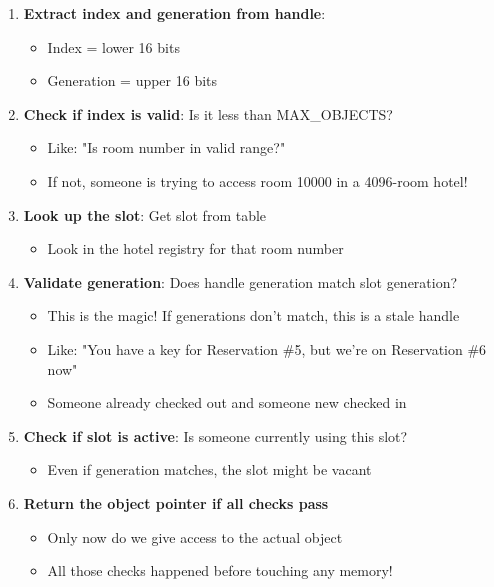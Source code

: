 \begin{enumerate}
    \item \textbf{Extract index and generation from handle}:
    \begin{itemize}
        \item Index = lower 16 bits
        \item Generation = upper 16 bits
    \end{itemize}

    \item \textbf{Check if index is valid}: Is it less than MAX\_OBJECTS?
    \begin{itemize}
        \item Like: "Is room number in valid range?"
        \item If not, someone is trying to access room 10000 in a 4096-room hotel!
    \end{itemize}

    \item \textbf{Look up the slot}: Get slot from table
    \begin{itemize}
        \item Look in the hotel registry for that room number
    \end{itemize}

    \item \textbf{Validate generation}: Does handle generation match slot generation?
    \begin{itemize}
        \item This is the magic! If generations don't match, this is a stale handle
        \item Like: "You have a key for Reservation \#5, but we're on Reservation \#6 now"
        \item Someone already checked out and someone new checked in
    \end{itemize}

    \item \textbf{Check if slot is active}: Is someone currently using this slot?
    \begin{itemize}
        \item Even if generation matches, the slot might be vacant
    \end{itemize}

    \item \textbf{Return the object pointer if all checks pass}
    \begin{itemize}
        \item Only now do we give access to the actual object
        \item All those checks happened before touching any memory!
    \end{itemize}
\end{enumerate}

